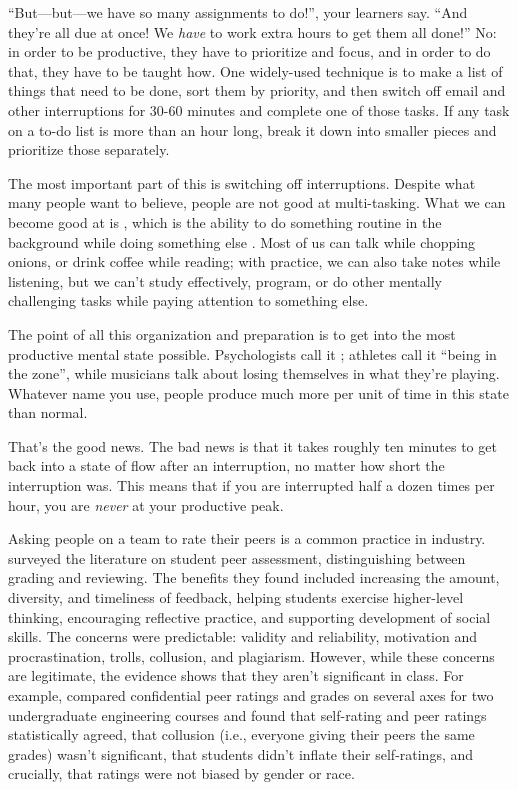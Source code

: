``But---but---we have so many assignments to do!'', your learners say. ``And
they're all due at once! We \emph{have} to work extra hours to get them all
done!'' No: in order to be productive, they have to prioritize and
focus, and in order to do that, they have to be taught how. One
widely-used technique is to make a list of things that need to be done,
sort them by priority, and then switch off email and other interruptions
for 30-60 minutes and complete one of those tasks. If any task on a
to-do list is more than an hour long, break it down into smaller pieces
and prioritize those separately.

The most important part of this is switching off
interruptions. Despite what many people want to believe, people are
not good at multi-tasking. What we can become good at is
, which is the ability to do something
routine in the background while doing something else
\cite{Mill2016a}. Most of us can talk while chopping onions, or
drink coffee while reading; with practice, we can also take notes
while listening, but we can't study effectively, program, or do other
mentally challenging tasks while paying attention to something else.

The point of all this organization and preparation is to get into the
most productive mental state possible. Psychologists call it
 \cite{Csik2008}; athletes call it ``being in the
zone'', while musicians talk about losing themselves in what they're
playing. Whatever name you use, people produce much more per unit of
time in this state than normal.

That's the good news. The bad news is that it takes roughly ten minutes
to get back into a state of flow after an interruption, no matter how
short the interruption was. This means that if you are interrupted half
a dozen times per hour, you are \emph{never} at your productive peak.


Asking people on a team to rate their peers is a common practice in
industry. \cite{Sond2012} surveyed the literature on student peer
assessment, distinguishing between grading and reviewing. The benefits
they found included increasing the amount, diversity, and timeliness of
feedback, helping students exercise higher-level thinking, encouraging
reflective practice, and supporting development of social skills. The
concerns were predictable: validity and reliability, motivation and
procrastination, trolls, collusion, and plagiarism. However, while these
concerns are legitimate, the evidence shows that they aren't significant
in class. For example, \cite{Kauf2000} compared confidential peer
ratings and grades on several axes for two undergraduate engineering
courses and found that self-rating and peer ratings statistically
agreed, that collusion (i.e., everyone giving their peers the same
grades) wasn't significant, that students didn't inflate their
self-ratings, and crucially, that ratings were not biased by gender or
race.

